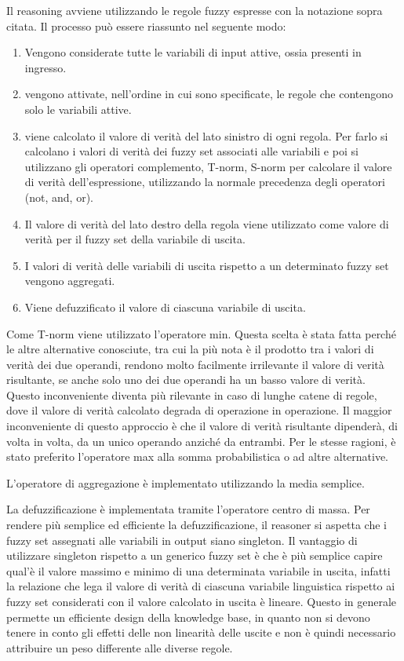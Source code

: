 Il reasoning avviene utilizzando le regole fuzzy espresse con la notazione sopra citata. Il processo può essere riassunto nel seguente modo:

\begin{enumerate}
 \item Vengono considerate tutte le variabili di input attive, ossia presenti in ingresso.
 \item vengono attivate, nell'ordine in cui sono specificate, le regole che contengono solo le variabili attive.
 \item viene calcolato il valore di verità del lato sinistro di ogni regola. Per farlo si calcolano i valori di verità dei fuzzy set associati alle variabili e poi si utilizzano gli operatori complemento, T-norm, S-norm per calcolare il valore di verità dell'espressione, utilizzando la normale precedenza degli operatori (not, and, or).
 \item Il valore di verità del lato destro della regola viene utilizzato come valore di verità per il fuzzy set della variabile di uscita.
 \item I valori di verità delle variabili di uscita rispetto a un determinato fuzzy set vengono aggregati.
 \item Viene defuzzificato il valore di ciascuna variabile di uscita. 
\end{enumerate}

Come T-norm viene utilizzato l'operatore min. Questa scelta è stata fatta perché le altre alternative conosciute, tra cui la più nota è il prodotto tra i valori di verità dei due operandi, rendono molto facilmente irrilevante il valore di verità risultante, se anche solo uno dei due operandi ha un basso valore di verità. Questo inconveniente diventa più rilevante in caso di lunghe catene di regole, dove il valore di verità calcolato degrada di operazione in operazione. Il maggior inconveniente di questo approccio è che il valore di verità risultante dipenderà, di volta in volta, da un unico operando anziché da entrambi.
Per le stesse ragioni, è stato preferito l'operatore max alla somma probabilistica o ad altre alternative.

L'operatore di aggregazione è implementato utilizzando la media semplice.

La defuzzificazione è implementata tramite l'operatore centro di massa. Per rendere più semplice ed efficiente la defuzzificazione, il reasoner si aspetta che i fuzzy set assegnati alle variabili in output siano singleton. Il vantaggio di utilizzare singleton rispetto a un generico fuzzy set è che è più semplice capire qual'è il valore massimo e minimo di una determinata variabile in uscita, infatti la relazione che lega il valore di verità di ciascuna variabile linguistica rispetto ai fuzzy set considerati con il valore calcolato in uscita è lineare. Questo in generale permette un efficiente design della knowledge base, in quanto non si devono tenere in conto gli effetti delle non linearità delle uscite e non è quindi necessario attribuire un peso differente alle diverse regole.

